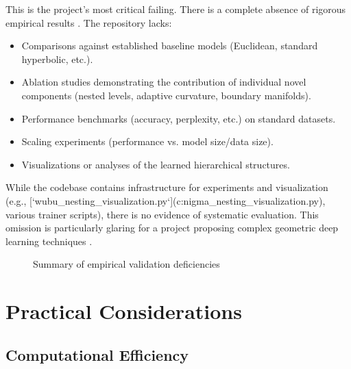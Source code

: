 \documentclass[11pt]{article}
\begin{document}
This is the project's most critical failing. There is a complete absence of rigorous empirical results \cite{WilsonEtAl2017}. The repository lacks:
\begin{itemize}[noitemsep]
    \item Comparisons against established baseline models (Euclidean, standard hyperbolic, etc.).
    \item Ablation studies demonstrating the contribution of individual novel components (nested levels, adaptive curvature, boundary manifolds).
    \item Performance benchmarks (accuracy, perplexity, etc.) on standard datasets.
    \item Scaling experiments (performance vs. model size/data size).
    \item Visualizations or analyses of the learned hierarchical structures.
\end{itemize}

While the codebase contains infrastructure for experiments and visualization (e.g., [`wubu_nesting_visualization.py`](c:\Users\3nigma\source\repos\bytropix\wubu_nesting_visualization.py), various trainer scripts), there is no evidence of systematic evaluation. This omission is particularly glaring for a project proposing complex geometric deep learning techniques \cite{BronsteinEtAl2021}.

\begin{figure}[H]
\centering
{}
\caption{Summary of empirical validation deficiencies}
\label{fig:empirical_deficiencies}
\end{figure}

\section{Practical Considerations}

\subsection{Computational Efficiency}
\end{document}
